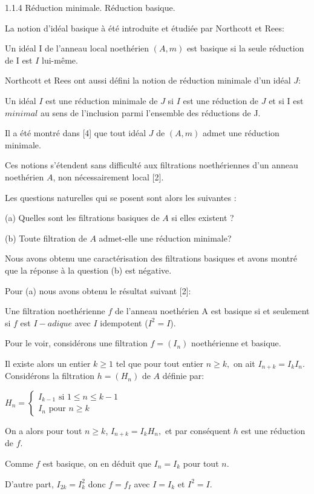 \documentclass[11pt, twoside]{article}
\begin{document}
1.1.4 Réduction minimale. Réduction basique.

La notion d'idéal basique à été introduite et étudiée par Northcott et Rees: 

Un idéal I de l'anneau local noethérien $(A,m)$ est basique si la
seule réduction de I est $I$ lui-m\^{e}me. 

Northcott et Rees ont aussi défini la notion de réduction minimale
d'un idéal $J$:

Un idéal $I$ est une réduction minimale de $J$ si $I$ est une réduction de $J$ et si I est $minimal$ au sens de l'inclusion parmi l'ensemble
des réductions de J. 

Il a été montré dans [4] que tout idéal $J$ de $(A,m)$ admet
une réduction minimale.

Ces notions s'étendent sans difficulté aux filtrations noethériennes d'un anneau noethérien $A$, non nécessairement local [2]. 

Les questions naturelles qui se posent sont alors les suivantes :

(a) Quelles sont les filtrations basiques de $A$ si elles existent ?

(b) Toute filtration de $A$ admet-elle une réduction minimale?

Nous avons obtenu une caractérisation des filtrations basiques et avons
montré que la réponse à la question (b) est négative.

Pour (a) nous avons obtenu le résultat suivant [2]:

Une filtration noethérienne $f $ de l'anneau noethérien A est
basique si et seulement si $f$ est $I-adique$ avec $I$ idempotent ($I^{2}=I$).

Pour le voir, considérons une filtration $f=(I_{n})$ noethérienne et
basique. 

Il existe alors un entier $k\geq 1$ tel que pour tout entier $n\geq k,$ on
ait $I_{n+k}=I_{k}I_{n}.$ Considérons la filtration $h=(H_{n})$ de $A$ définie par:

$H_{n}=\left\{ 
\begin{array}{c}
I_{k-1}\text{ si }1\leq n\leq k-1 \\ 
I_{n}\text{ pour }n\geq k%
\end{array}%
\right. $ 

On a alors pour tout $n\geq k$, $I_{n+k}=I_{k}H_{n},$ et par conséquent $h$ est une réduction de $f.$

Comme $f$ est basique, on en déduit que $I_{n}=I_{k}$ pour tout $n.$

D'autre part, $I_{2k}=I_{k}^{2}$ donc $f=f_{I}$ avec $I=I_{k}$ et $I^{2}=I.$
\end{document}

